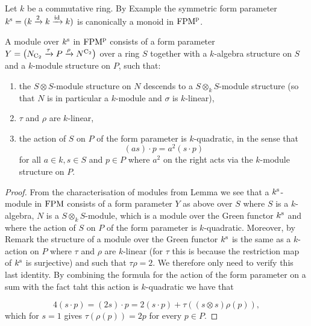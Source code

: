 Let $k$ be a commutative ring. By Example  the symmetric form parameter $k^{\mathrm{s}}=(k\xrightarrow{2}k\xrightarrow{\mathrm{id}}k)$ is canonically a monoid in $\mathrm {FPM}^{\mathrm p}$.


\begin{lemma}
\label{lemma:moduleskg}%
A module over $k^{\mathrm{s}}$ in $\mathrm {FPM}^{\mathrm p}$ consists of a form parameter
$
Y=\big(N_{\mathrm{C_2}}\xrightarrow{\tau}P\xrightarrow{\rho}N^{\mathrm{C_2}}\big)
$
over a ring $S$ together with a $k$-algebra structure on $S$ and a $k$-module structure on $P$, such that:
\begin{enumerate}
\item the $S\otimes S$-module structure on $N$ descends to a $S\otimes_k S$-module structure (so that $N$ is in particular a $k$-module and $\sigma$ is $k$-linear),
\item  $\tau$ and $\rho$ are $k$-linear,
\item the action of $S$ on $P$ of the form parameter is $k$-quadratic, in the sense that
\[
(as)\cdot p=a^2(s\cdot p)
 \]
for all $a\in k, s\in S$ and $p\in P$ where $a^2$ on the right acts via the $k$-module structure on $P$.
\end{enumerate}
\end{lemma}
 
\begin{proof}
From the characterisation of modules from Lemma  we see that a $k^{\mathrm{s}}$-module in $\mathrm {FPM}$ consists of a form parameter $Y$ as above over $S$ where $S$ is a $k$-algebra, $N$ is a $S\otimes_k S$-module, which is a module over the Green functor $k^{\mathrm{s}}$ and where the action of $S$ on $P$ of the form parameter is $k$-quadratic. Moreover, by Remark  the structure of a module over the Green functor $k^{\mathrm{s}}$ is the same as a $k$-action on $P$ where $\tau$ and $\rho$ are $k$-linear (for $\tau$ this is because the restriction map of $k^{\mathrm{s}}$ is surjective) and such that $\tau\rho =2$. We therefore only need to verify this last identity. By combining the formula for the action of the form parameter on a sum with the fact taht this action is $k$-quadratic we have that
 
\[
4(s\cdot p)=(2s)\cdot p=2(s\cdot p)+\tau((s\otimes s)\rho (p)),
\]
 which for $s=1$ gives $\tau(\rho (p))=2p$ for every $p\in P$.
\end{proof}



